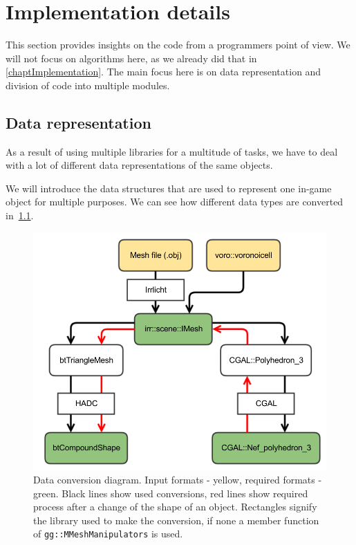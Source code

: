 \chapter{Implementation details}
This section provides insights on the code from a programmers point of view. We will not focus on algorithms here, as we already did that in \cref{chaptImplementation}. The main focus here is on data representation and division of code into multiple modules.

\section{Data representation}
As a result of using multiple libraries for a multitude of tasks, we have to deal with a lot of different data representations of the same objects. 

We will introduce the data structures that are used to represent one in-game object for multiple purposes. We can see how different data types are converted in~\cref{fig:conversions}.

\begin{figure}
        \centering
        \includegraphics[width=\textwidth]{img/conversions}
        \caption{Data conversion diagram. Input formats - yellow, required formats - green. Black lines show used conversions, red lines show required process after a change of the shape of an object. Rectangles signify the library used to make the conversion, if none a member function of {\tt gg::MMeshManipulators} is used.}
        \label{fig:conversions}
\end{figure}

